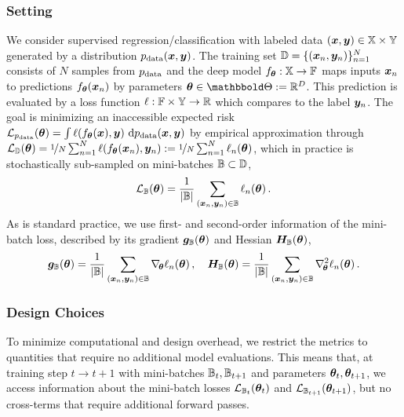 \subsubsection{Setting}

We consider supervised regression/classification with labeled data $({\bm{x}}, {\bm{y}})
\in {\mathbb{X}} \times {\mathbb{Y}}$ generated by a distribution $p_{\mathrm{data}}({\bm{x}}, {\bm{y}})$. The training
set ${\mathbb{D}} = \{ ({\bm{x}}_n, {\bm{y}}_n)\}_{n=1}^N$ consists of $N$ \iid samples from
$p_{\mathrm{data}}$ and the deep model $f_{{\bm{\theta}}}: {\mathbb{X}} \rightarrow {\mathbb{F}}$ maps inputs
${\bm{x}}_n$ to predictions $f_{{\bm{\theta}}}({\bm{x}}_n)$ by parameters $\vtheta \in \sTheta
:= \sR^D$. This prediction is evaluated by a loss function $\ell : {\mathbb{F}} \times
{\mathbb{Y}} \rightarrow \mathbb{R}$ which compares to the label ${\bm{y}}_n$. The goal is minimizing
an inaccessible expected risk ${\mathcal{L}}_{p_{\mathrm{data}}}({\bm{\theta}}) = \int
\ell(f_{{\bm{\theta}}}({\bm{x}}), {\bm{y}}) \ {\textnormal{d}} p_{\mathrm{data}}({\bm{x}}, {\bm{y}})$ by empirical approximation
through ${\mathcal{L}}_{{\mathbb{D}}}({\bm{\theta}}) = \nicefrac{1}{N} \sum_{n=1}^N
\ell(f_{{\bm{\theta}}}({\bm{x}}_n), {\bm{y}}_n) := \nicefrac{1}{N} \sum_{n=1}^N
\ell_n({\bm{\theta}})$, which in practice is stochastically sub-sampled on
mini-batches ${\mathbb{B}} \subset {\mathbb{D}}$,
\begin{align}
  \label{cockpit::eq:mini-batch-loss}
  {\mathcal{L}}_{{\mathbb{B}}}({\bm{\theta}}) = \frac{1}{|{\mathbb{B}}|} \sum_{({\bm{x}}_n,{\bm{y}}_n) \in{\mathbb{B}}} \ell_n({\bm{\theta}})\,.
\end{align}
As is standard practice, we use first- and second-order information of the
mini-batch loss, described by its gradient ${\bm{g}}_{{\mathbb{B}}}({\bm{\theta}})$ and Hessian
${\bm{H}}_{{\mathbb{B}}}({\bm{\theta}})$,
\begin{align}
  {\bm{g}}_{{\mathbb{B}}}({\bm{\theta}})
  =
  \frac{1}{|{\mathbb{B}}|} \sum_{({\bm{x}}_n, {\bm{y}}_n) \in {\mathbb{B}}}
  \nabla_{\!{{\bm{\theta}}}}\ell_n({\bm{\theta}})\, ,
  \quad
  {\bm{H}}_{{\mathbb{B}}}({\bm{\theta}})
  =
  \frac{1}{|{\mathbb{B}}|} \sum_{({\bm{x}}_n, {\bm{y}}_n) \in {\mathbb{B}}}
  \nabla_{\!{{\bm{\theta}}}}^{2} \ell_n({\bm{\theta}})\,.
\end{align}

\subsubsection{Design Choices}

To minimize computational and design overhead, we restrict the metrics to
quantities that require no additional model evaluations. This means that, at
training step $t \to t + 1$ with mini-batches ${\mathbb{B}}_t, {\mathbb{B}}_{t+1}$ and parameters
${\bm{\theta}}_t, {\bm{\theta}}_{t+1}$, we access information about the mini-batch losses
${\mathcal{L}}_{{\mathbb{B}}_t}({\bm{\theta}}_t)$ and ${\mathcal{L}}_{{\mathbb{B}}_{t+1}}({\bm{\theta}}_{t+1})$, but no
cross-terms that require additional forward passes.

